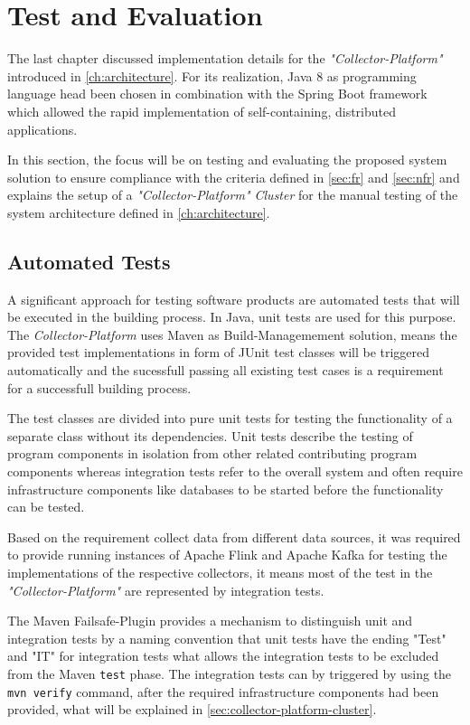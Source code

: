 \chapter{Test and Evaluation}
\label{ch:evaluation}
The last chapter discussed implementation details for the \textit{"Collector-Platform"} introduced in \autoref{ch:architecture}.
For its realization, Java 8 as programming language head been chosen in combination with the Spring Boot framework which allowed
the rapid implementation of self-containing, distributed applications.

In this section, the focus will be on testing and evaluating the proposed system solution to ensure compliance with the criteria
defined in \autoref{sec:fr} and \autoref{sec:nfr} and explains the setup of a \textit{"Collector-Platform" Cluster} for the manual
testing of the system architecture defined in \autoref{ch:architecture}.

\section{Automated Tests}

A significant approach for testing software products are automated tests that will be executed in the building process.
In Java, unit tests are used for this purpose. The \textit{Collector-Platform} uses Maven as Build-Managemement solution,
means the provided test implementations in form of JUnit test classes will be triggered automatically and the sucessfull passing
all existing test cases is a requirement for a successfull building process.

The test classes are divided into pure unit tests for testing the functionality of a separate class without its dependencies.
Unit tests describe the testing of program components in isolation from other related contributing program components whereas
integration tests refer to the overall system and often require infrastructure components like databases to be started before
the functionality can be tested.

Based on the requirement collect data from different data sources, it was required to provide running instances of Apache Flink and Apache Kafka
for testing the implementations of the respective collectors, it means most of the test in the \textit{"Collector-Platform"} are represented by
integration tests.

The Maven Failsafe-Plugin provides a mechanism to distinguish unit and integration tests by a naming convention that unit tests
have the ending "Test" and "IT" for integration tests what allows the integration tests to be excluded from the Maven \verb|test|
phase. The integration tests can by triggered by using the \verb|mvn verify| command, after the required infrastructure components
had been provided, what will be explained in \autoref{sec:collector-platform-cluster}.


